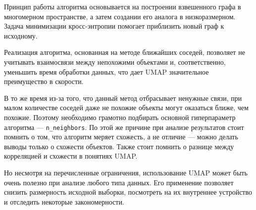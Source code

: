 Принцип работы алгоритма основывается на построении взвешенного графа в многомерном пространстве, а затем создании его аналога в низкоразмерном. Задача минимизации кросс-энтропии помогает приблизить новый граф к исходному.

Реализация алгоритма, основанная на методе ближайших соседей, позволяет не учитывать взаимосвязи между непохожими объектами и, соответственно, уменьшить время обработки данных, что дает UMAP значительное преимущество в скорости.

В то же время из-за того, что данный метод отбрасывает ненужные связи, при малом количестве соседей даже не похожие объекты могут оказаться ближе, чем похожие. Поэтому необходимо грамотно подбирать основной гиперпараметр алгоритма --- \verb|n_neighbors|. По этой же причине при анализе результатов стоит помнить о том, что алгоритм меряет схожесть, а не отличие --- можно делать выводы только о схожести объектов. Также стоит помнить о разнице между корреляцией и схожести в понятиях UMAP. 

Но несмотря на перечисленные ограничения, использование UMAP может быть очень полезно при анализе любого типа данных. Его применение позволяет снизить размерность исходной выборки, посмотреть на их внутреннее устройство и отследить некоторые закономерности.